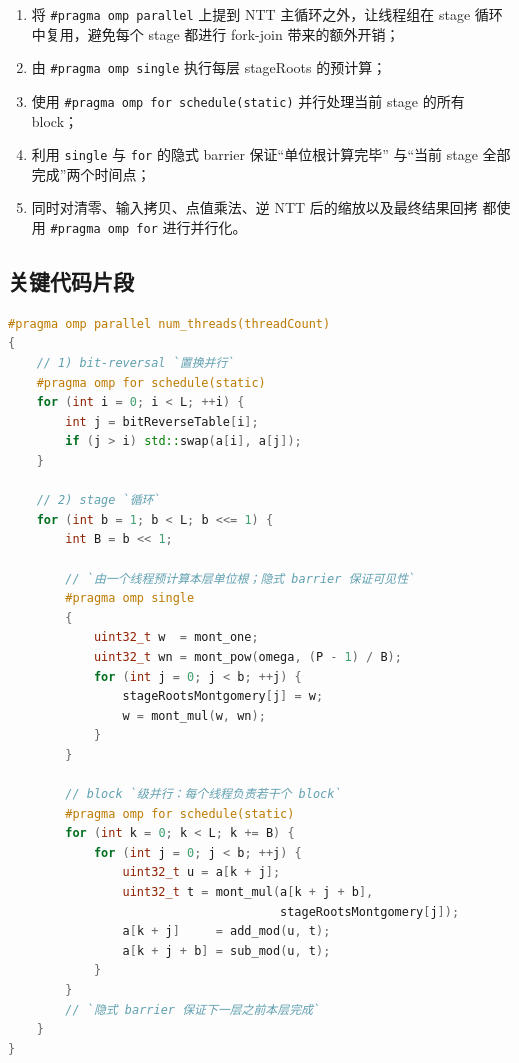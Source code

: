 \documentclass[UTF8,a4paper,10pt]{ctexart}
\begin{document}
\begin{enumerate}
  \item 将 \texttt{\#pragma omp parallel} 上提到 NTT 主循环之外，让线程组在
        stage 循环中复用，避免每个 stage 都进行 fork-join 带来的额外开销；
  \item 由 \texttt{\#pragma omp single} 执行每层 stageRoots 的预计算；
  \item 使用 \texttt{\#pragma omp for schedule(static)} 并行处理当前 stage
        的所有 block；
  \item 利用 \texttt{single} 与 \texttt{for} 的隐式 barrier 保证``单位根计算完毕''
        与``当前 stage 全部完成''两个时间点；
  \item 同时对清零、输入拷贝、点值乘法、逆 NTT 后的缩放以及最终结果回拷
        都使用 \texttt{\#pragma omp for} 进行并行化。
\end{enumerate}

\subsection{关键代码片段}

\begin{lstlisting}[title=OpenMP NTT 主体伪代码,frame=trbl,language={C++}]
#pragma omp parallel num_threads(threadCount)
{
    // 1) bit-reversal `置换并行`
    #pragma omp for schedule(static)
    for (int i = 0; i < L; ++i) {
        int j = bitReverseTable[i];
        if (j > i) std::swap(a[i], a[j]);
    }

    // 2) stage `循环`
    for (int b = 1; b < L; b <<= 1) {
        int B = b << 1;

        // `由一个线程预计算本层单位根；隐式 barrier 保证可见性`
        #pragma omp single
        {
            uint32_t w  = mont_one;
            uint32_t wn = mont_pow(omega, (P - 1) / B);
            for (int j = 0; j < b; ++j) {
                stageRootsMontgomery[j] = w;
                w = mont_mul(w, wn);
            }
        }

        // block `级并行：每个线程负责若干个 block`
        #pragma omp for schedule(static)
        for (int k = 0; k < L; k += B) {
            for (int j = 0; j < b; ++j) {
                uint32_t u = a[k + j];
                uint32_t t = mont_mul(a[k + j + b],
                                      stageRootsMontgomery[j]);
                a[k + j]     = add_mod(u, t);
                a[k + j + b] = sub_mod(u, t);
            }
        }
        // `隐式 barrier 保证下一层之前本层完成`
    }
}
\end{lstlisting}
\end{document}
